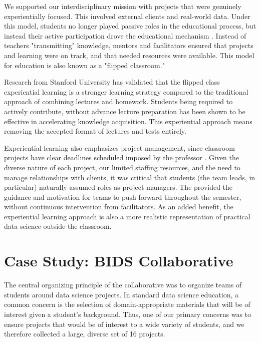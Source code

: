 \documentclass{sig-alternate}
\begin{document}
We supported our interdisciplinary mission with projects that were genuinely experientially focused.  This involved external clients and real-world data. Under this model, students no longer played passive roles in the educational process, but instead their active participation drove the educational mechanism \cite{beard2010experiential}. Instead of teachers "transmitting" knowledge, mentors and facilitators ensured that projects and learning were on track, and that needed resources were available. This model for education is also known as a "flipped classroom."

Research from Stanford University \cite{plotnikoff_classes_2013} has validated that the flipped class experiential learning is a stronger learning strategy compared to the traditional approach of combining lectures and homework. Students being required to actively contribute, without advance lecture preparation has been shown to be effective in accelerating knowledge acquisition. This experiential approach means removing the accepted format of lectures and tests entirely. 

Experiential learning also emphasizes project management, since classroom projects have clear deadlines scheduled imposed by the professor \cite{mok2014teaching}. Given the diverse nature of each project, our limited staffing resources, and the need to manage relationships with clients, it was critical that students (the team leads, in particular) naturally assumed roles as project managers.  The provided the guidance and motivation for teams to push forward throughout the semester, without continuous intervention from facilitators. As an added benefit, the experiential learning approach is also a more realistic representation of practical data science outside the classroom.



\section{Case Study: BIDS Collaborative}

The central organizing principle of the collaborative was to organize teams of students around data science projects. In standard data science education, a common concern is the selection of domain-appropriate materials that will be of interest given a student's background. Thus, one of our primary concerns was to ensure projects that would be of interest to a wide variety of students, and we therefore collected a large, diverse set of 16 projects. 
\end{document}
